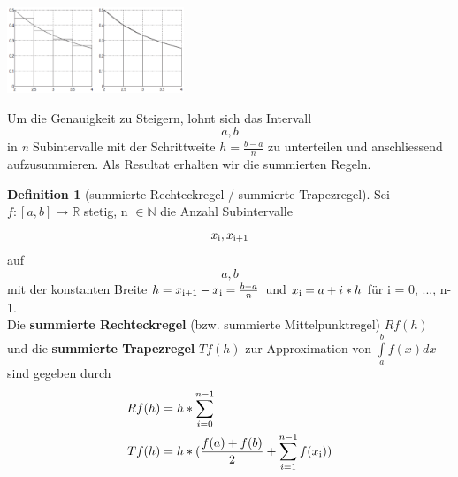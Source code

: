 \documentclass{article}
\newenvironment{Figure}
	{\par\medskip\noindent\minipage{\linewidth}}
	{\endminipage\par\medskip}
\theoremstyle{satz}
\theoremstyle{definition}
\newtheorem{definition}{Definition}
\begin{document}
\begin{Figure}
\centering
\includegraphics[width=200px]{img/sumRechteckregel_sumTrapezregel.png}
	\label{fig:(links)summierte Rechtecksregel, (rechts) summierte Trapezregel}
\end{Figure}

Um die Genauigkeit zu Steigern, lohnt sich das Intervall \[a,b\] in \textit{n} Subintervalle mit der Schrittweite $h=\frac{b-a}{n}$ zu unterteilen und anschliessend aufzusummieren. Als Resultat erhalten wir die summierten Regeln.

\theoremstyle{definition}
\begin{definition}[summierte Rechteckregel / summierte Trapezregel]
Sei $f: [a,b] \rightarrow \mathbb{R}$ stetig, n $\in \mathbb{N}$ die Anzahl Subintervalle \[x\textsubscript{i}, x\textsubscript{i+1}\] auf \[a,b\] mit der konstanten Breite $h=x\textsubscript{i+1} - x\textsubscript{i} = \frac{b-a}{n}$ und $x\textsubscript{i} = a + i * h$ für i = 0, ..., n-1.\\
Die \textbf{summierte Rechteckregel} (bzw. summierte Mittelpunktregel) $Rf(h)$ und die \textbf{summierte Trapezregel} $Tf(h)$ zur Approximation von $\int\limits_{a}^{b} f(x)dx$ sind gegeben durch
\begin{equation}
\begin{split}
Rf(h) & = h * \sum\limits_{i=0}^{n-1}\\
Tf(h) & = h*(\frac{f(a)+f(b)}{2}+\sum\limits_{i=1}^{n-1}f(x\textsubscript{i}))
\end{split}
\end{equation}
\end{definition}
\end{document}
